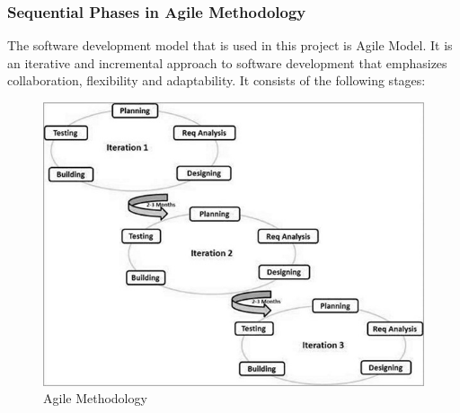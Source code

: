 \documentclass[oneside, 12pt]{book}
\begin{document}
			\subsubsection{Sequential Phases in Agile Methodology}
				The software development model that is used in this project is Agile Model. It is an iterative and incremental approach to software development that emphasizes collaboration, flexibility and adaptability. It consists of the following stages:
				\begin{figure}[H]
					\includegraphics[width=\linewidth]{./Resources/agile.png}
				    \caption{Agile Methodology}
				    \label{fig:agile}
				\end{figure}
\end{document}
